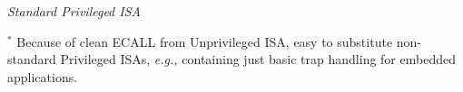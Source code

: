 \documentclass{article}
\newcommand{\eg}{\emph{e.g.,}}
\begin{document}
\clearpage


\vspace*{3in}

\begin{center}\Huge
  \emph{Standard Privileged ISA}

\vfill

\begin{minipage}{9in}\Large
  $^*$ Because of clean ECALL from Unprivileged ISA, easy to
  substitute non-standard Privileged ISAs, {\eg} containing just basic
  trap handling for embedded applications.
\end{minipage}

\end{center}

\clearpage

\end{document}
